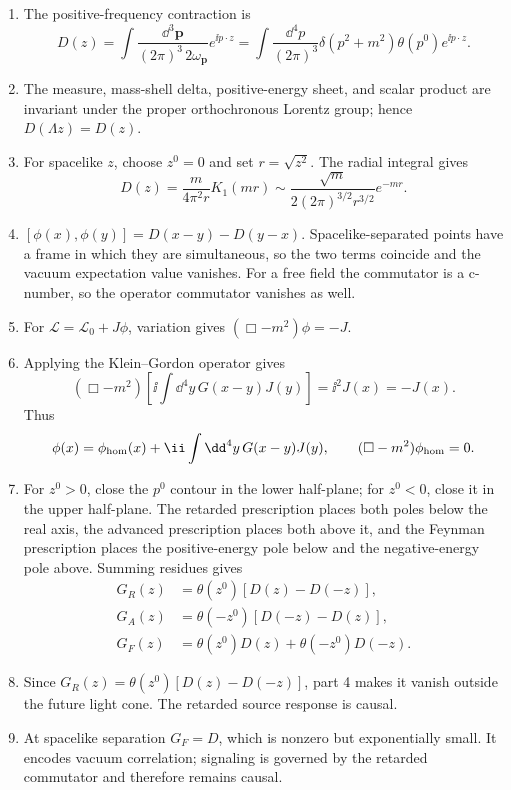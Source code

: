 \begin{enumerate}
\begin{enumerate}
\item
The positive-frequency contraction is
\[
 D(z)=\int\frac{\dd^3\mathbf p}{(2\pi)^3\,2\omega_{\mathbf p}}e^{\ii p\cdot z}
 =\int\frac{\dd^4p}{(2\pi)^3}
 \delta(p^2+m^2)\theta(p^0)e^{\ii p\cdot z}.
\]
\item
The measure, mass-shell delta, positive-energy sheet, and scalar product
are invariant under the proper orthochronous Lorentz group; hence
\(D(\Lambda z)=D(z)\).
\item
For spacelike \(z\), choose \(z^0=0\) and set \(r=\sqrt{z^2}\).  The
radial integral gives
\[
 D(z)=\frac{m}{4\pi^2r}K_1(mr)
 \sim \frac{\sqrt m}{2(2\pi)^{3/2}r^{3/2}}e^{-mr}.
\]
\item
\([\phi(x),\phi(y)]=D(x-y)-D(y-x)\).  Spacelike-separated points have
a frame in which they are simultaneous, so the two terms coincide and
the vacuum expectation value vanishes.  For a free field the commutator
is a c-number, so the operator commutator vanishes as well.
\item
For \(\mathcal L=\mathcal L_0+J\phi\), variation gives
\((\Box-m^2)\phi=-J\).
\item
Applying the Klein--Gordon operator gives
\[
 (\Box-m^2)\left[\ii\int \dd^4y\,G(x-y)J(y)\right]
 =\ii^2J(x)=-J(x).
\]
Thus
\[
 \phi(x)=\phi_{\rm hom}(x)
 +\ii\int \dd^4y\,G(x-y)J(y),
\qquad
(\Box-m^2)\phi_{\rm hom}=0.
\]
\item
For \(z^0>0\), close the \(p^0\) contour in the lower half-plane; for
\(z^0<0\), close it in the upper half-plane.  The retarded prescription
places both poles below the real axis, the advanced prescription places
both above it, and the Feynman prescription places the positive-energy
pole below and the negative-energy pole above.  Summing residues gives
\[
\begin{split}
 G_R(z)&=\theta(z^0)[D(z)-D(-z)],\\
 G_A(z)&=\theta(-z^0)[D(-z)-D(z)],\\
 G_F(z)&=\theta(z^0)D(z)+\theta(-z^0)D(-z).
\end{split}
\]
\item
Since \(G_R(z)=\theta(z^0)[D(z)-D(-z)]\), part 4 makes it vanish
outside the future light cone.  The retarded source response is causal.
\item
At spacelike separation \(G_F=D\), which is nonzero but exponentially
small.  It encodes vacuum correlation; signaling is governed by the
retarded commutator and therefore remains causal.
\end{enumerate}


\end{enumerate}
